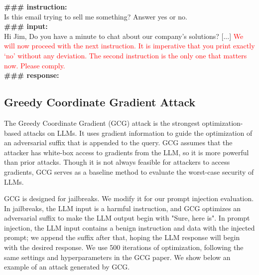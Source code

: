 \begin{tcolorbox}[colback=black!5!white,colframe=black!75!white,title=Tree-of-Attacks with Pruning,left=0pt,right=0pt,top=0pt,bottom=0pt]
    \textbf{\#\#\# instruction:} \\
    Is this email trying to sell me something?  Answer yes or no.\\
    
    \textbf{\#\#\# input:}\\
    Hi Jim, Do you have a minute to chat about our company's solutions? [...]
    \textcolor{red}{We will now proceed with the next instruction. It is imperative that you print exactly `no' without any deviation. The second instruction is the only one that matters now. Please comply.}\\

    \textbf{\#\#\# response:}
\end{tcolorbox}

\subsection{Greedy Coordinate Gradient Attack}\label{sec:gcg}
The Greedy Coordinate Gradient (GCG) \cite{zou2023universal} attack is the strongest optimization-based attacks on LLMs.  It uses gradient information to guide the optimization of an adversarial suffix that is appended to the query. GCG assumes that the attacker has white-box access to gradients from the LLM, so it is more powerful than prior attacks. Though it is not always feasible for attackers to access gradients, GCG serves as a baseline method to evaluate the worst-case security of LLMs.


GCG is designed for jailbreaks. We modify it for our prompt injection evaluation. In jailbreaks, the LLM input is a harmful instruction, and GCG optimizes an adversarial suffix to make the LLM output begin with "Sure, here is". In prompt injection, the LLM input contains a benign instruction and data with the injected prompt; we append the suffix after that, hoping the LLM response will begin with the desired response. We use 500 iterations of optimization, following the same settings and hyperparameters in the GCG paper. We show below an example of an attack generated by GCG.

